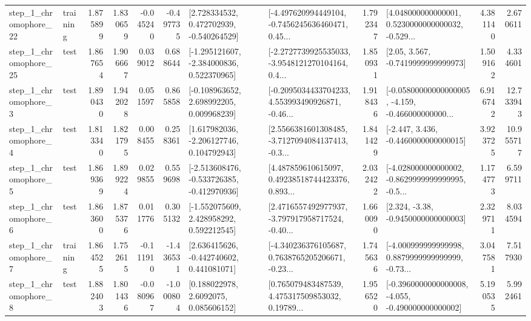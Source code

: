 \begin{tabular}{llrrrrllrlrr}
    step\_1\_chromophore\_22 &  training &      1.875899 &    1.830659 &     -0.045240 & -0.497735 &    [2.728334532, 0.472702939, -0.540264529] &  [-4.497620994449104, -0.7456245636460471, 0.45... &       1.792347 &  [4.048000000000001, 0.5230000000000032, -0.529... &            4.381140 &          2.670611 \\
    step\_1\_chromophore\_25 &      test &      1.867654 &    1.906667 &      0.039012 &  0.688644 &   [-1.295121607, -2.384000836, 0.522370965] &  [-2.2727739925535033, -3.9548121270104164, 0.4... &       1.850931 &                 [2.05, 3.567, -0.7419999999999973] &            1.509162 &          4.334601 \\
     step\_1\_chromophore\_3 &      test &      1.890430 &    1.942028 &      0.051597 &  0.865858 &    [-0.108963652, 2.698992205, 0.009968239] &  [-0.2095034433704233, 4.553993490926871, -0.46... &       1.918436 &  [-0.05800000000000005, -4.159, -0.466000000000... &            6.916742 &         12.733943 \\
     step\_1\_chromophore\_4 &      test &      1.813340 &    1.821795 &      0.008455 &  0.258361 &    [1.617982036, -2.206127746, 0.104792943] &  [2.5566381601308485, -3.7127094084137413, -0.3... &       1.841429 &               [-2.447, 3.436, -0.4460000000000015] &            3.923725 &         10.955717 \\
     step\_1\_chromophore\_5 &      test &      1.869369 &    1.899224 &      0.029855 &  0.559698 &  [-2.513608476, -0.533726385, -0.412970936] &  [4.487859610615097, 0.49238518744423376, 0.893... &       2.032422 &  [-4.028000000000002, -0.8629999999999995, -0.5... &            1.174773 &          6.599711 \\
     step\_1\_chromophore\_6 &      test &      1.863600 &    1.875376 &      0.011776 &  0.305132 &    [-1.552075609, 2.428958292, 0.592212545] &  [2.4716557492977937, -3.797917958717524, -0.40... &       1.660090 &                [2.324, -3.38, -0.9450000000000003] &            2.329711 &          8.034594 \\
     step\_1\_chromophore\_7 &  training &      1.864525 &    1.752615 &     -0.111910 & -1.436531 &    [2.636415626, -0.442740602, 0.441081071] &  [-4.340236376105687, 0.7638765205206671, -0.23... &       1.745636 &  [-4.000999999999998, 0.8879999999999999, -0.73... &            3.047581 &          7.517930 \\
     step\_1\_chromophore\_8 &      test &      1.882403 &    1.801436 &     -0.080967 & -1.000804 &       [0.188022978, 2.6092075, 0.085606152] &  [0.765079483487539, 4.475317509853032, 0.19789... &       1.956520 &  [-0.3960000000000008, -4.055, -0.490000000000002] &            5.190535 &          5.992461 \\

\end{tabular}
